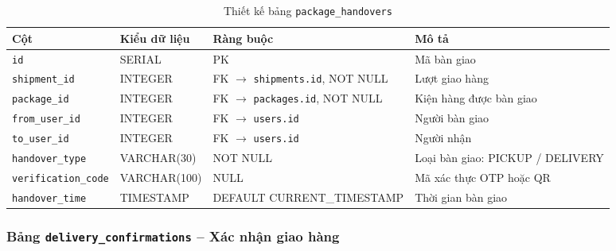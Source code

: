 \begin{table}[H]
\centering
\caption{Thiết kế bảng \texttt{package\_handovers}}
\begin{tabularx}{\textwidth}{|l|l|Z|Z|}
\hline
\textbf{Cột} &
\textbf{Kiểu dữ liệu} &
\textbf{Ràng buộc} &
\textbf{Mô tả} \\ \hline

\texttt{id}
& SERIAL
& PK
& Mã bàn giao \\ \hline

\texttt{shipment\_id}
& INTEGER
& FK $\rightarrow$ \texttt{shipments.id}, NOT NULL
& Lượt giao hàng \\ \hline

\texttt{package\_id}
& INTEGER
& FK $\rightarrow$ \texttt{packages.id}, NOT NULL
& Kiện hàng được bàn giao \\ \hline

\texttt{from\_user\_id}
& INTEGER
& FK $\rightarrow$ \texttt{users.id}
& Người bàn giao \\ \hline

\texttt{to\_user\_id}
& INTEGER
& FK $\rightarrow$ \texttt{users.id}
& Người nhận \\ \hline

\texttt{handover\_type}
& VARCHAR(30)
& NOT NULL
& Loại bàn giao: PICKUP / DELIVERY \\ \hline

\texttt{verification\_code}
& VARCHAR(100)
& NULL
& Mã xác thực OTP hoặc QR \\ \hline

\texttt{handover\_time}
& TIMESTAMP
& DEFAULT CURRENT\_TIMESTAMP
& Thời gian bàn giao \\ \hline

\end{tabularx}
\end{table}



\subsubsection{Bảng \texttt{delivery\_confirmations} -- Xác nhận giao hàng}

